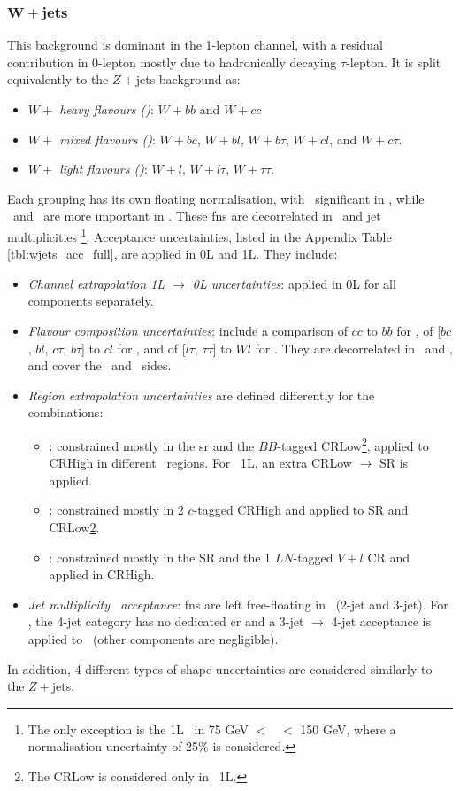 \subsubsection{$\boldsymbol{W+}$jets}
This background is dominant in the 1-lepton channel, with a residual contribution in 0-lepton mostly due to hadronically decaying $\tau$-lepton. It is split equivalently to the $Z+$jets background as:   
\begin{itemize}
    \item \textit{$W+$ heavy flavours (\whf)}: $W+bb$ and $W+cc$
    \item \textit{$W+$ mixed flavours (\wmf)}: $W+bc$, $W+bl$, $W+b\tau$, $W+cl$, and $W+c\tau$.
    \item \textit{$W+$ light flavours (\wlf)}: $W+l$, $W+l\tau$, $W+\tau\tau$.
\end{itemize}
Each grouping has its own floating normalisation, with \whf\ significant in \vhb, while \wmf\ and \wlf\ are more important in \vhc. These \glspl{fn} are decorrelated in \ptv\ and jet multiplicities \nj\footnote{The only exception is the 1L \wlf\ in 75 GeV $<$ \ptv\ $<$ 150 GeV, where a normalisation uncertainty of 25\% is considered.}. Acceptance uncertainties, listed in the Appendix Table \ref{tbl:wjets_acc_full}, are applied in 0L and 1L. They include:
\begin{itemize}[leftmargin=*]
    \item \textit{Channel extrapolation 1L $\rightarrow$ 0L uncertainties}: applied in 0L for all components separately. 
    \item \textit{Flavour composition uncertainties}: include a comparison of $cc$ to $bb$ for \whf, of [$bc$, $bl$, $c\tau$, $b\tau$] to $cl$ for \wmf, and of [$l\tau$, $\tau\tau$] to $Wl$ for \wlf. They are decorrelated in \ptv\ and \nj, and cover the \vhb\ and \vhc\ sides. 
    \item \textit{Region extrapolation uncertainties} are defined differently for the combinations:
    \begin{itemize}
        \item \whf: constrained mostly in the \gls{sr} and the $BB$-tagged CRLow\footnote{\label{footnote-crlow}The CRLow is considered only in \vhb\ 1L.}, applied to CRHigh in different \ptv\ regions. For \vhb\ 1L, an extra CRLow $\rightarrow$ SR is applied. 
        \item \wmf: constrained mostly in 2 $c$-tagged CRHigh and applied to SR and CRLow\cref{footnote-crlow}.
        \item \wlf: constrained mostly in the SR and the 1 $LN$-tagged $V+l$ CR and applied in CRHigh. %
    \end{itemize}
    \item \textit{Jet multiplicity \nj\ acceptance}: \glspl{fn} are left free-floating in \nj\ (2-jet and 3-jet). For \vhb, the 4-jet category has no dedicated \gls{cr} and a 3-jet $\rightarrow$ 4-jet acceptance is applied to \whf\ (other components are negligible).
\end{itemize}
In addition, 4 different types of shape uncertainties are considered similarly to the $Z+$jets.

